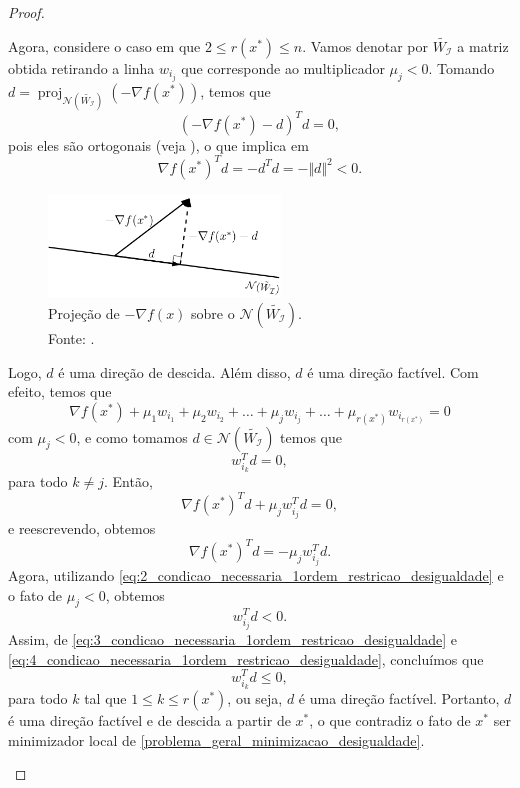 \documentclass[12pt,a4paper]{scrartcl}
\DeclareMathOperator{\proj}{proj}
\theoremstyle{definition}%
\begin{document}
\begin{proof}
\begin{enumerate}
Agora, considere o caso em que $2\leq r(x^{*}) \leq n$. Vamos denotar por $\tilde{W_{\mathcal{I}}}$ a matriz obtida retirando a linha $w_{i_{j}}$ que corresponde ao multiplicador $\mu_{j} <0$. Tomando $d=\proj_{\mathcal{N}(\tilde{W_{\mathcal{I}}})} (-\nabla f(x^{*}))$, temos que
\[
(-\nabla f(x^{*}) -d)^{T}d =0,
\]
pois eles são ortogonais (veja ), o que implica em
\[ \label{eq:2_condicao_necessaria_1ordem_restricao_desigualdade}
\nabla f(x^{*})^{T}d = -d^{T}d = -\Vert d \Vert^{2} <0. \]
\begin{figure}[!ht] 
	\centering
	\includegraphics[width=0.55\textwidth]{projecao_gradiente_sobre_nucleoW}
	\caption{Projeção de $-\nabla f(x)$ sobre o $\mathcal{N}(\tilde{W_{\mathcal{I}}})$. \\ Fonte: \textcite{Ana1994}. \label{fig:projecao_gradiente_sobre_nucleoA}}
\end{figure}

Logo, $d$ é uma direção de descida. Além disso, $d$ é uma direção factível. Com efeito, temos que
\[
\nabla f(x^{*}) + \mu_{1} w_{i_{1}} + \mu_{2} w_{i_{2}} + \ldots + \mu_{j} w_{i_{j}} + \ldots + \mu_{r(x^{*})} w_{i_{r(x^{*})}} =0
\]
com $\mu_{j} <0$, e como tomamos $d \in \mathcal{N}(\tilde{W_{\mathcal{I}}})$ temos que
\[ \label{eq:3_condicao_necessaria_1ordem_restricao_desigualdade}
w_{i_{k}}^{T}d =0, 
\]
para todo $k \neq j$. Então,
\[
\nabla f(x^{*})^{T}d + \mu_{j} w_{i_{j}}^{T} d =0,
\]
e reescrevendo, obtemos
\[
\nabla f(x^{*})^{T}d = -\mu_{j} w_{i_{j}}^{T} d.
\]
Agora, utilizando \eqref{eq:2_condicao_necessaria_1ordem_restricao_desigualdade} e o fato de $\mu_{j} <0$, obtemos
\[ \label{eq:4_condicao_necessaria_1ordem_restricao_desigualdade}
w_{i_{j}}^{T} d <0.
\]
Assim, de \eqref{eq:3_condicao_necessaria_1ordem_restricao_desigualdade} e \eqref{eq:4_condicao_necessaria_1ordem_restricao_desigualdade}, concluímos que
\[
w_{i_{k}}^{T} d \leq 0,
\]
para todo $k$ tal que $1 \leq k \leq r(x^{*})$, ou seja, $d$ é uma direção factível. Portanto, $d$ é uma direção factível e de descida a partir de $x^{*}$, o que contradiz o fato de $x^{*}$ ser minimizador local de \eqref{problema_geral_minimizacao_desigualdade}.
\end{enumerate}
\end{proof}
\end{document}
